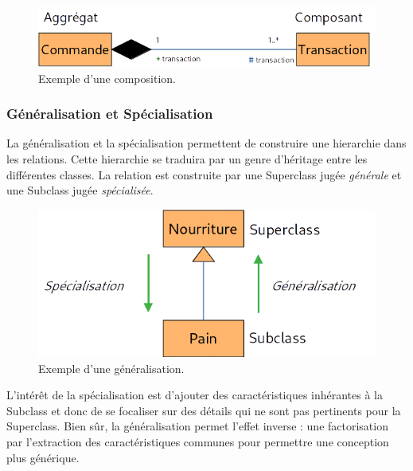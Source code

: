 \documentclass[../Syllabus.tex]{subfiles}
\begin{document}
\begin{figure}[htp]
    \centering
    \includegraphics[width=12cm]{./img/chapter2-composition.png}
    \caption{Exemple d'une composition.}
    \label{fig:chapter2-composition}
\end{figure}


\subsubsection{Généralisation et Spécialisation}

La généralisation et la spécialisation permettent de construire une hierarchie dans les relations. Cette hierarchie se traduira par un genre d'héritage entre les différentes classes. La relation est construite par une Superclass jugée \textit{générale} et une Subclass jugée \textit{spécialisée}.

\begin{figure}[htp]
    \centering
    \includegraphics[width=12cm]{./img/chapter2-generalisation.png}
    \caption{Exemple d'une généralisation.}
    \label{fig:chapter2-generalisation}
\end{figure}

L'intérêt de la spécialisation est d'ajouter des caractéristiques inhérantes à la Subclass et donc de se focaliser sur des détails qui ne sont pas pertinents pour la Superclass. Bien sûr, la généralisation permet l'effet inverse : une factorisation par l'extraction des caractéristiques communes pour permettre une conception plus générique.
\end{document}
